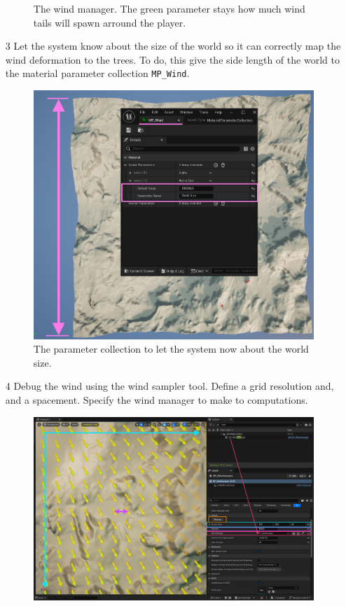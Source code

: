 \documentclass[../main.tex]{subfile}
\begin{document}
\begin{itemize}
\begin{figure}[H]
            \caption{The wind manager. The green parameter stays how much wind tails will spawn arround the player.}
        \end{figure}
        \item[3] Let the system know about the size of the world so it can correctly map the wind deformation to the trees. 
        To do, this give the side length of the world to the material parameter collection \texttt{MP\_Wind}.
        \begin{figure}[H]
            \centering
            \includegraphics[width=1\textwidth]{Ressources/WorldSize.png}
            \caption{The parameter collection to let the system now about the world size.}
        \end{figure}
        \item[4] Debug the wind using the wind sampler tool. Define a grid resolution and, and a spacement. Specify the wind manager to make to computations.
        \begin{figure}[H]
            \centering
            \includegraphics[width=1\textwidth]{Ressources/WindSampler.png}

\end{figure}
\end{itemize}
\end{document}
